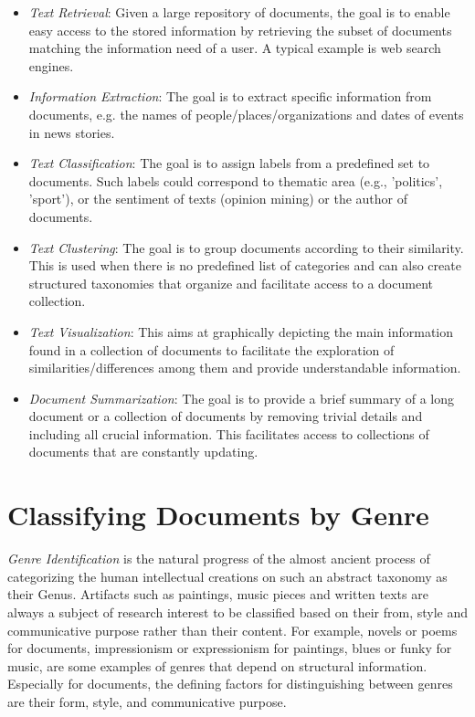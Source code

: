 \begin{itemize}
\item \textit{Text Retrieval}: Given a large repository of documents, the goal is to enable easy access to the stored information by retrieving the subset of documents matching the information need of a user. A typical example is web search engines.
\item \textit{Information Extraction}: The goal is to extract specific information from documents, e.g. the names of people/places/organizations and dates of events in news stories.
\item \textit{Text Classification}: The goal is to assign labels from a predefined set to documents. Such labels could correspond to thematic area (e.g., 'politics', 'sport'), or the sentiment of texts (opinion mining) or the author of documents.
\item \textit{Text Clustering}: The goal is to group documents according to their similarity. This is used when there is no predefined list of categories and can also create structured taxonomies that organize and facilitate access to a document collection.
\item \textit{Text Visualization}: This aims at graphically depicting the main information found in a collection of documents to facilitate the exploration of similarities/differences among them and provide understandable information.
\item \textit{Document Summarization}: The goal is to provide a brief summary of a long document or a collection of documents by removing trivial details and including all crucial information. This facilitates access to collections of documents that are constantly updating. 
\end{itemize}

\section{Classifying Documents by Genre} \label{chap:introduction:sec:classifying_by_genre}

\textit{Genre Identification} is the natural progress of the almost ancient process of categorizing the human intellectual creations on such an abstract taxonomy as their Genus. Artifacts such as paintings, music pieces and written texts are always a subject of research interest to be classified based on their from, style and communicative purpose rather than their content. For example, novels or poems for documents, impressionism or expressionism for paintings, blues or funky for music, are some examples of genres that depend on structural information. Especially for documents, the defining factors for distinguishing between genres are their form, style, and communicative purpose.

